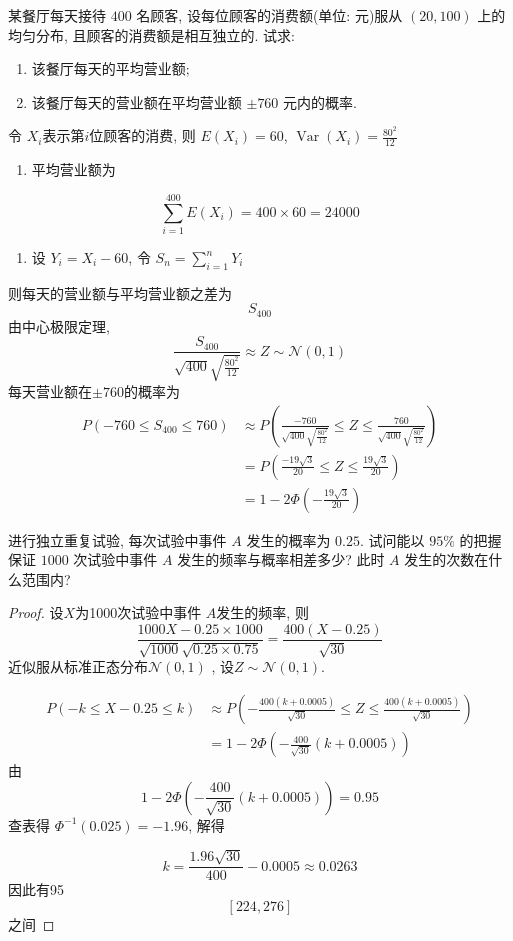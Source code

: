 \documentclass[../main.tex]{subfiles}
\begin{document}
\begin{exercise}{}{}
某餐厅每天接待 $400$ 名顾客, 设每位顾客的消费额(单位: 元)服从 $(20,100)$ 上的均匀分布, 且顾客的消费额是相互独立的. 试求:
\begin{enumerate}
    \item 该餐厅每天的平均营业额;
    \item 该餐厅每天的营业额在平均营业额 $\pm760$ 元内的概率.
\end{enumerate}
\end{exercise}
\begin{solution}
令 $X_{i}$表示第$i$位顾客的消费, 则
$E\left(X_{i}\right)=60$, $\operatorname{Var}\left(X_{i}\right)=\frac{80^{2} }{12 }$
\begin{enumerate}
    \item 平均营业额为
\end{enumerate}
 $$ \sum _{i= 1}^{400}E\left(X_{i}\right)= 400 \times 60= 24000 $$
\begin{enumerate}
    \item 设 $Y_{i}=X_{i}-60$, 令 $S_{n}= \sum _{i= 1}^{n}Y_{i}$
\end{enumerate}
则每天的营业额与平均营业额之差为
 $$ S_{400} $$
由中心极限定理,
 $$ \frac{S_{400} }{\sqrt{400} \sqrt{\frac{80^{2} }{12 }} }\approx  Z\sim \mathcal{N}\left(0,1\right) $$
每天营业额在$\pm 760$的概率为
 $$ \begin{aligned} P\left(-760\le S_{400}\le 760\right)&\approx P\left(\frac{-760 }{\sqrt{400}\sqrt{\frac{80^{2} }{12 }} }\le Z\le\frac{760 }{\sqrt{400}\sqrt{\frac{80^{2} }{12 }} }\right)\\&= P\left(\frac{-19 \sqrt{3}}{20 }\le Z\le \frac{19\sqrt{3} }{20 }\right)\\&=  1-2\Phi \left(-\frac{19\sqrt{3} }{20 }\right)\end{aligned}  $$
\end{solution}
\begin{exercise}{}{}
进行独立重复试验, 每次试验中事件 $A$ 发生的概率为 $0.25$. 试问能以 $95\%$ 的把握保证 $1000$ 次试验中事件 $A$ 发生的频率与概率相差多少? 此时 $A$ 发生的次数在什么范围内?
\end{exercise}
\begin{proof}
设$X$为1000次试验中事件 $A$发生的频率, 则
 $$ \frac{ 1000 X-0.25\times 1000}{\sqrt{1000} \sqrt{0.25\times 0.75} } = \frac{400\left(X-0.25\right) }{\sqrt{30}}$$
近似服从标准正态分布$\mathcal{N}\left(0,1\right)$ , 设$Z\sim \mathcal{N}\left(0,1\right)$.

 $$ \begin{aligned} P\left(-k\le X-0.25\le k\right)&\approx P\left(-\frac{400\left(k+ 0.0005\right) }{\sqrt{30}  }\le Z\le \frac{400\left(k+ 0.0005\right) }{\sqrt{30} }\right)\\&= 1-2\Phi \left(-\frac{400 }{ \sqrt{30}}\left(k+ 0.0005\right)\right) \end{aligned} $$
  由
 $$ 1-2\Phi \left(-\frac{400 }{ \sqrt{30}}\left(k+ 0.0005\right)\right)= 0.95 $$
查表得 $\Phi^{-1}(0.025) = -1.96$, 解得

 $$ k = \frac{1.96\sqrt{30}}{400} - 0.0005 \approx 0.0263 $$
因此有95%
 $$ \left[224, 276\right] $$
之间
\end{proof}
\end{document}
